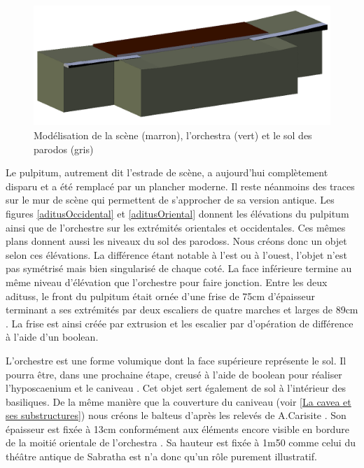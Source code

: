 \begin{figure}[!h]
	\includegraphics[width=\linewidth]{images/modOrchestre}
	\caption[Modélisation de la scène, l'\gls{orchestra} et le sol des \gls{parodos}]{Modélisation de la scène (marron), l'\gls{orchestra} (vert) et le sol des \gls{parodos} (gris)} 
	\label{modOrchestre} 
\end{figure} 

Le \gls{pulpitum}, autrement dit l'estrade de scène, a aujourd'hui complètement disparu et a été remplacé par un plancher moderne. Il reste néanmoins des traces sur le mur de scène qui permettent de s'approcher de sa version antique. Les figures \ref{aditusOccidental} et \ref{aditusOriental} donnent les élévations du pulpitum ainsi que de l'orchestre sur les extrémités orientales et occidentales. Ces mêmes plans donnent aussi les niveaux du sol des \glspl{parodos}. Nous créons donc un objet selon ces élévations. La différence étant notable à l'est ou à l'ouest, l'objet n'est pas symétrisé mais bien singularisé de chaque coté. La face inférieure termine au même niveau d'élévation que l'orchestre pour faire jonction. Entre les deux \glspl{aditus}, le front du \gls{pulpitum} était ornée d'une frise de 75cm d'épaisseur terminant a ses extrémités par deux escaliers de quatre marches et larges de 89cm \cite[p. 458]{formigeBis}. La frise est ainsi créée par extrusion et les escalier par d'opération de différence à l'aide d'un \gls{boolean}.

L'orchestre est une forme volumique dont la face supérieure représente le sol. Il pourra être, dans une prochaine étape, creusé à l'aide de \gls{boolean} pour réaliser l'\gls{hyposcaenium} et le caniveau \cite[Chap. VI]{orangeTxt}. Cet objet sert également de sol à l'intérieur des \glspl{basilique}. De la même manière que la couverture du caniveau (voir \ref{La cavea et ses substructures}) nous créons le \gls{balteus} d'après les relevés de A.Carisite \cite[Pl. I]{orangePl}. Son épaisseur est fixée à 13cm conformément aux éléments encore visible en bordure de la moitié orientale de l'\gls{orchestra} \cite[p. 340]{orangeTxt}. Sa hauteur est fixée à 1m50 comme celui du théâtre antique de Sabratha \cite[p. 96]{lachaux} est n'a donc qu'un rôle purement illustratif.

